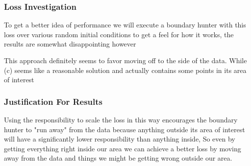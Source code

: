 \documentclass{article}
\begin{document}
\subsubsection{Loss Investigation}
To get a better idea of performance we will execute a boundary hunter with this loss over various random initial conditions to get a feel for how it works, the results are somewhat disappointing however

\begin{figure}[H]
\centering
  \hfill
\hfill
{}
\end{figure}

This approach definitely seems to favor moving off to the side of the data. While (c) seems like a reasonable solution and actually contains some points in its area of interest

\subsubsection{Justification For Results}
Using the responsibility to scale the loss in this way encourages the boundary hunter to "run away" from the data because anything outside its area of interest will have a significantly lower responsibility than anything inside, So even by getting everything right inside our area we can achieve a better loss by moving away from the data and things we might be getting wrong outside our area.
\end{document}
